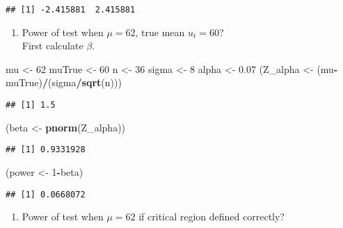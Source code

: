 \documentclass[]{article}
\newenvironment{Shaded}{\begin{snugshade}}{\end{snugshade}}
\newcommand{\KeywordTok}[1]{\textcolor[rgb]{0.13,0.29,0.53}{\textbf{#1}}}
\newcommand{\DecValTok}[1]{\textcolor[rgb]{0.00,0.00,0.81}{#1}}
\newcommand{\FloatTok}[1]{\textcolor[rgb]{0.00,0.00,0.81}{#1}}
\newcommand{\StringTok}[1]{\textcolor[rgb]{0.31,0.60,0.02}{#1}}
\newcommand{\OperatorTok}[1]{\textcolor[rgb]{0.81,0.36,0.00}{\textbf{#1}}}
\newcommand{\NormalTok}[1]{#1}
\providecommand{\tightlist}{%
  \setlength{\itemsep}{0pt}\setlength{\parskip}{0pt}}
\begin{document}
\begin{verbatim}
## [1] -2.415881  2.415881
\end{verbatim}

\begin{enumerate}
\def\labelenumi{(\alph{enumi})}
\setcounter{enumi}{1}
\tightlist
\item
  Power of test when \(\mu=62\), true mean \(u_t=60\)?\\
  First calculate \(\beta\).
\end{enumerate}

\begin{Shaded}
\begin{Highlighting}[]
\NormalTok{mu <-}\StringTok{ }\DecValTok{62}
\NormalTok{muTrue <-}\StringTok{ }\DecValTok{60}
\NormalTok{n <-}\StringTok{ }\DecValTok{36}
\NormalTok{sigma <-}\StringTok{ }\DecValTok{8}
\NormalTok{alpha <-}\StringTok{ }\FloatTok{0.07}
\NormalTok{(Z_alpha <-}\StringTok{ }\NormalTok{(mu}\OperatorTok{-}\NormalTok{muTrue)}\OperatorTok{/}\NormalTok{(sigma}\OperatorTok{/}\KeywordTok{sqrt}\NormalTok{(n)))}
\end{Highlighting}
\end{Shaded}

\begin{verbatim}
## [1] 1.5
\end{verbatim}

\begin{Shaded}
\begin{Highlighting}[]
\NormalTok{(beta <-}\StringTok{ }\KeywordTok{pnorm}\NormalTok{(Z_alpha))}
\end{Highlighting}
\end{Shaded}

\begin{verbatim}
## [1] 0.9331928
\end{verbatim}

\begin{Shaded}
\begin{Highlighting}[]
\NormalTok{(power <-}\StringTok{ }\DecValTok{1}\OperatorTok{-}\NormalTok{beta)}
\end{Highlighting}
\end{Shaded}

\begin{verbatim}
## [1] 0.0668072
\end{verbatim}

\begin{enumerate}
\def\labelenumi{(\alph{enumi})}
\setcounter{enumi}{2}
\tightlist
\item
  Power of test when \(\mu=62\) if critical region defined correctly?
\end{enumerate}
\end{document}
